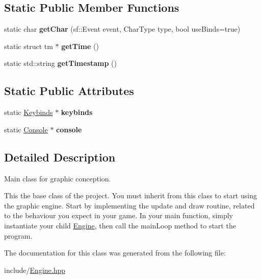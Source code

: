 \subsection*{Static Public Member Functions}
\begin{DoxyCompactItemize}
\item 
static char {\bfseries get\+Char} (sf\+::\+Event event, Char\+Type type, bool use\+Binds=true)\hypertarget{classEngine_a8de2605cee789558ae211e4fac46b5e1}{}\label{classEngine_a8de2605cee789558ae211e4fac46b5e1}

\item 
static struct tm $\ast$ {\bfseries get\+Time} ()\hypertarget{classEngine_afb9db1b96d86458ae665b2614fd0bd9b}{}\label{classEngine_afb9db1b96d86458ae665b2614fd0bd9b}

\item 
static std\+::string {\bfseries get\+Timestamp} ()\hypertarget{classEngine_ad89df061e48c5dfb14632b67fc77fe0c}{}\label{classEngine_ad89df061e48c5dfb14632b67fc77fe0c}

\end{DoxyCompactItemize}
\subsection*{Static Public Attributes}
\begin{DoxyCompactItemize}
\item 
static \hyperlink{classKeybinds}{Keybinds} $\ast$ {\bfseries keybinds}\hypertarget{classEngine_a8a8da9ed9351a24a655f86b5bec194d3}{}\label{classEngine_a8a8da9ed9351a24a655f86b5bec194d3}

\item 
static \hyperlink{classConsole}{Console} $\ast$ {\bfseries console}\hypertarget{classEngine_a53c45cdb8fb792675360bcd126a11c55}{}\label{classEngine_a53c45cdb8fb792675360bcd126a11c55}

\end{DoxyCompactItemize}


\subsection{Detailed Description}
Main class for graphic conception. 

This the base class of the project. You must inherit from this class to start using the graphic engine. Start by implementing the update and draw routine, related to the behaviour you expect in your game. In your main function, simply instantiate your child \hyperlink{classEngine}{Engine}, then call the main\+Loop method to start the program. 

The documentation for this class was generated from the following file\+:\begin{DoxyCompactItemize}
\item 
include/\hyperlink{Engine_8hpp}{Engine.\+hpp}\end{DoxyCompactItemize}
